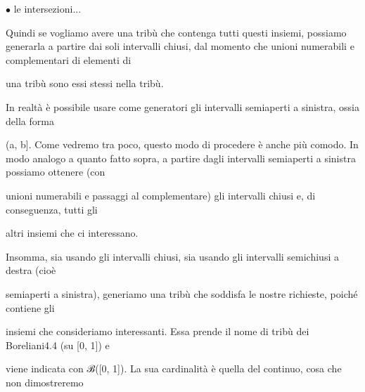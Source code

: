 \documentclass[a4paper,portrait,12pt]{article}
\begin{document}
\begin{flushleft}
$\bullet$ le intersezioni...
\end{flushleft}


\begin{flushleft}
Quindi se vogliamo avere una tribù che contenga tutti questi insiemi, possiamo generarla a partire dai soli intervalli chiusi, dal momento che unioni numerabili e complementari di elementi di
\end{flushleft}


\begin{flushleft}
una tribù sono essi stessi nella tribù.
\end{flushleft}


\begin{flushleft}
In realt\`{a} \`{e} possibile usare come generatori gli intervalli semiaperti a sinistra, ossia della forma
\end{flushleft}


\begin{flushleft}
(a, b]. Come vedremo tra poco, questo modo di procedere \`{e} anche più comodo. In modo analogo a quanto fatto sopra, a partire dagli intervalli semiaperti a sinistra possiamo ottenere (con
\end{flushleft}


\begin{flushleft}
unioni numerabili e passaggi al complementare) gli intervalli chiusi e, di conseguenza, tutti gli
\end{flushleft}


\begin{flushleft}
altri insiemi che ci interessano.
\end{flushleft}


\begin{flushleft}
Insomma, sia usando gli intervalli chiusi, sia usando gli intervalli semichiusi a destra (cio\`{e}
\end{flushleft}


\begin{flushleft}
semiaperti a sinistra), generiamo una tribù che soddisfa le nostre richieste, poich\'{e} contiene gli
\end{flushleft}


\begin{flushleft}
insiemi che consideriamo interessanti. Essa prende il nome di tribù dei Boreliani4.4 (su [0, 1]) e
\end{flushleft}


\begin{flushleft}
viene indicata con ℬ([0, 1]). La sua cardinalit\`{a} \`{e} quella del continuo, cosa che non dimostreremo
\end{flushleft}
\end{document}
